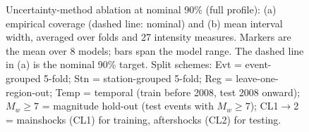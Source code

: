 \begin{figure}[htbp]
\centering
{}
\caption{Uncertainty-method ablation at nominal 90\% (full profile): (a) empirical coverage (dashed line: nominal) and (b) mean interval width, averaged over folds and 27 intensity measures. Markers are the mean over 8 models; bars span the model range. The dashed line in (a) is the nominal 90\% target. Split schemes: Evt = event-grouped 5-fold; Stn = station-grouped 5-fold; Reg = leave-one-region-out; Temp = temporal (train before 2008, test 2008 onward); $M_w{\geq}7$ = magnitude hold-out (test events with $M_w \geq 7$); CL1$\rightarrow$2 = mainshocks (CL1) for training, aftershocks (CL2) for testing.}
\label{fig:fig4_conformal_ablation}
\end{figure}
